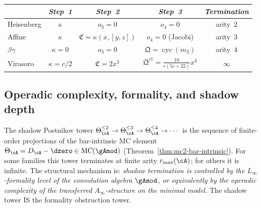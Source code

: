 \begin{example}
\label{ex:tower-four-archetypes}
\begin{center}
\small
\renewcommand{\arraystretch}{1.15}
\begin{tabular}{lcccc}
\toprule
& \emph{Step~1} & \emph{Step~2} & \emph{Step~3}
  & \emph{Termination} \\
\midrule
Heisenberg &
  $\kappa$ & $o_3 = 0$ & $o_4 = 0$  & arity~$2$ \\
Affine &
  $\kappa$ & $\mathfrak{C} = \kappa(x,[y,z])$ &
  $o_4 = 0$ (Jacobi) & arity~$3$ \\
$\beta\gamma$ &
  $\kappa{=}0$ & $o_3 = 0$ &
  $\mathfrak{Q} = \operatorname{cyc}(m_3)$ & arity~$4$ \\
Virasoro &
  $\kappa{=}c/2$ & $\mathfrak{C} = 2x^3$ &
  $\mathfrak{Q}^{\mathrm{ct}} = \tfrac{10}{c(5c+22)}x^4$ &
  $\infty$ \\
\bottomrule
\end{tabular}
\end{center}
\end{example}

\subsection{Operadic complexity, formality, and shadow depth}
\label{subsec:operadic-complexity-shadow-depth}

The shadow Postnikov tower
$\Theta_\cA^{\leq 2} \to \Theta_\cA^{\leq 3} \to
\Theta_\cA^{\leq 4} \to \cdots$ is the sequence of
finite-order projections of the bar-intrinsic MC element
$\Theta_\cA = D_\cA - \dzero \in
\mathrm{MC}(\gAmod)$
(Theorem~\ref{thm:mc2-bar-intrinsic}).
For some families this tower terminates at finite arity
$r_{\max}(\cA)$; for others it is infinite.
The structural mechanism is:
\emph{shadow termination is controlled by the
$L_\infty$-formality level of the convolution algebra
$\gAmod$, or equivalently by the operadic complexity
of the transferred $A_\infty$-structure on the minimal
model.}  The shadow tower IS the formality obstruction
tower.

